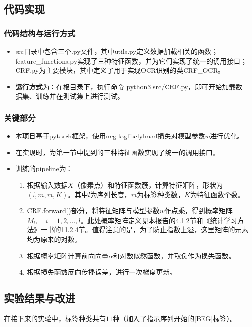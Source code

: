 \documentclass[a4paper,UTF8]{article}
\numberwithin{equation}{section}
\begin{document}
\subsection{代码实现}
\subsubsection{代码结构与运行方式}
\begin{itemize}
    \item src目录中包含三个.py文件，其中utils.py定义数据加载相关的函数；feature\_functions.py实现了三种特征函数，并为它们实现了统一的调用接口；CRF.py为主要模块，其中定义了用于实现OCR识别的类CRF\_OCR。
    \item \textbf{运行方式}为：在根目录下，执行命令 python3 src/CRF.py，即可开始加载数据集、训练并在测试集上进行测试。
\end{itemize}

\subsubsection{关键部分}
\begin{itemize}
    \item 本项目基于pytorch框架，使用neg-loglikelyhood损失对模型参数$w$进行优化。
    \item 在实现时，为第一节中提到的三种特征函数实现了统一的调用接口。
    \item 训练的pipeline为：
    \begin{enumerate}
        \item 根据输入数据$X$（像素点）和特征函数簇，计算特征矩阵，形状为$(l, m, m, K)$。其中$l$为序列长度，$m$为标签种类数，$K$为特征函数个数。
        \item CRF.forward()部分，将特征矩阵与模型参数$w$作点乘，得到概率矩阵$M_i, \quad i=1,2,...,l$。此处概率矩阵定义见本报告的4.1.2节和《统计学习方法》一书的11.2.4节。值得注意的是，为了防止指数上溢，这里矩阵的元素均为原来的对数。
        \item 根据概率矩阵计算前向向量$\alpha$和对数似然函数，并取负作为损失函数。
        \item 根据损失函数反向传播误差，进行一次梯度更新。
    \end{enumerate}
\end{itemize}

\subsection{实验结果与改进}
\par 在接下来的实验中，标签种类共有$11$种（加入了指示序列开始的[BEG]标签）。
\end{document}
